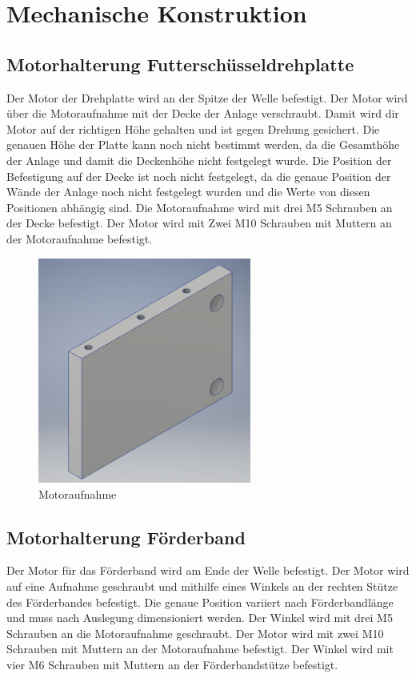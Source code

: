 \section{Mechanische Konstruktion}
\subsection{Motorhalterung Futterschüsseldrehplatte}
Der Motor der Drehplatte wird an der Spitze der Welle befestigt. Der Motor wird über die Motoraufnahme mit der Decke der Anlage verschraubt. Damit wird dir Motor auf der richtigen Höhe gehalten und ist gegen Drehung gesichert. Die genauen Höhe der Platte kann noch nicht bestimmt werden, da die Gesamthöhe der Anlage und damit die Deckenhöhe nicht festgelegt wurde. Die Position der Befestigung auf der Decke ist noch nicht festgelegt, da die genaue Position der Wände der Anlage noch nicht festgelegt wurden und die Werte von diesen Positionen abhängig sind. Die Motoraufnahme wird mit drei M5 Schrauben an der Decke befestigt. Der Motor wird mit Zwei M10 Schrauben mit Muttern an der Motoraufnahme befestigt.

\begin{figure}[H] 
\begin{center}

\includegraphics[width=7cm]{Bilder/Inventor/Motoraufnahme}
\caption{Motoraufnahme}
\label{Motoraufnahme}

\end{center}
\end{figure}

\subsection{Motorhalterung Förderband}
Der Motor für das Förderband wird am Ende der Welle befestigt. Der Motor wird auf eine Aufnahme geschraubt und mithilfe eines Winkels an der rechten Stütze des Förderbandes befestigt. Die genaue Position variiert nach Förderbandlänge und muss nach Auslegung dimensioniert werden. Der Winkel wird mit drei M5 Schrauben an die Motoraufnahme geschraubt. Der Motor wird mit zwei M10 Schrauben mit Muttern an der Motoraufnahme befestigt. Der Winkel wird mit vier M6 Schrauben mit Muttern an der Förderbandstütze befestigt.

